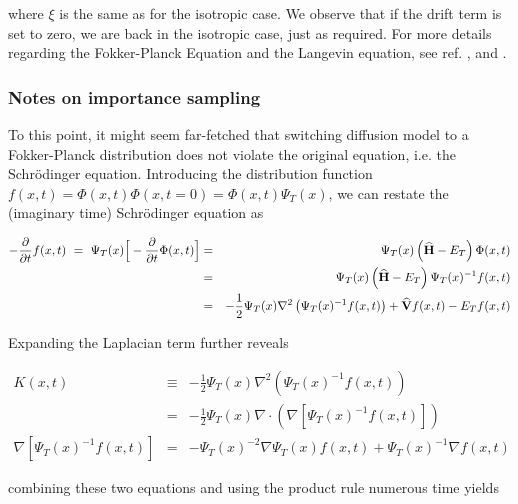 where $\xi$ is the same as for the isotropic case. We observe that if the drift term is set to zero, we are back in the isotropic case, just as required. For more details regarding the Fokker-Planck Equation and the Langevin equation, see ref. \cite{Gardiner:2004bk}, \cite{risken1989fpe} and \cite{langevin}.


\subsubsection{Notes on importance sampling}

To this point, it might seem far-fetched that switching diffusion model to a Fokker-Planck distribution does not violate the original equation, i.e. the Schrödinger equation. Introducing the distribution function $f(x, t) = \Phi(x, t)\Phi(x, t=0) = \Phi(x, t)\Psi_T(x)$, we can restate the (imaginary time) Schrödinger equation as

\begin{eqnarray}
-\frac{\partial}{\partial t}f(x, t)\,\, = \,\,\Psi_T(x)\Big[-\frac{\partial}{\partial t}\Phi(x, t)\Big] &=& \Psi_T(x)\left({\bf\widehat{H}} - E_T\right)\Phi(x, t) \nonumber\\
         &=& \Psi_T(x)\left({\bf\widehat{H}} - E_T\right)\Psi_T(x)^{-1}f(x, t) \label{eq:impSamplRaw}\\
         &=& -\frac{1}{2}\Psi_T(x)\nabla^2 \left(\Psi_T(x)^{-1}f(x, t)\right) + {\bf\widehat{V}}f(x, t) - E_Tf(x,t)\nonumber
\end{eqnarray}

Expanding the Laplacian term further reveals

\begin{eqnarray}
K(x, t) &\equiv& -\frac{1}{2}\Psi_T(x)\nabla^2 \left(\Psi_T(x)^{-1}f(x, t)\right) \nonumber\\
 &=& -\frac{1}{2}\Psi_T(x)\nabla\cdot (\nabla\left[\Psi_T(x)^{-1}f(x, t)\right]) \\
\nabla\left[\Psi_T(x)^{-1}f(x, t)\right] &=& -\Psi_T(x)^{-2}\nabla \Psi_T(x) f(x, t) + \Psi_T(x)^{-1}\nabla f(x, t)
\end{eqnarray}

combining these two equations and using the product rule numerous time yields

